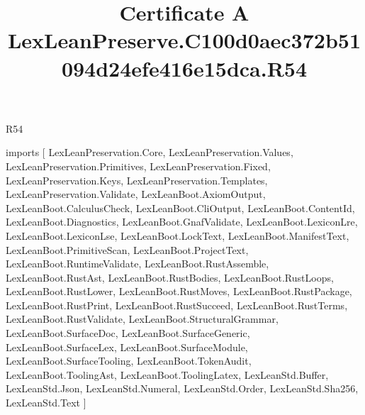 \begin{lexlean}{R54}
\title{Certificate A LexLeanPreserve.C100d0aec372b51094d24efe416e15dca.R54}
\begin{coremodule}
imports [
  LexLeanPreservation.Core,
  LexLeanPreservation.Values,
  LexLeanPreservation.Primitives,
  LexLeanPreservation.Fixed,
  LexLeanPreservation.Keys,
  LexLeanPreservation.Templates,
  LexLeanPreservation.Validate,
  LexLeanBoot.AxiomOutput,
  LexLeanBoot.CalculusCheck,
  LexLeanBoot.CliOutput,
  LexLeanBoot.ContentId,
  LexLeanBoot.Diagnostics,
  LexLeanBoot.GnafValidate,
  LexLeanBoot.LexiconLre,
  LexLeanBoot.LexiconLse,
  LexLeanBoot.LockText,
  LexLeanBoot.ManifestText,
  LexLeanBoot.PrimitiveScan,
  LexLeanBoot.ProjectText,
  LexLeanBoot.RuntimeValidate,
  LexLeanBoot.RustAssemble,
  LexLeanBoot.RustAst,
  LexLeanBoot.RustBodies,
  LexLeanBoot.RustLoops,
  LexLeanBoot.RustLower,
  LexLeanBoot.RustMoves,
  LexLeanBoot.RustPackage,
  LexLeanBoot.RustPrint,
  LexLeanBoot.RustSucceed,
  LexLeanBoot.RustTerms,
  LexLeanBoot.RustValidate,
  LexLeanBoot.StructuralGrammar,
  LexLeanBoot.SurfaceDoc,
  LexLeanBoot.SurfaceGeneric,
  LexLeanBoot.SurfaceLex,
  LexLeanBoot.SurfaceModule,
  LexLeanBoot.SurfaceTooling,
  LexLeanBoot.TokenAudit,
  LexLeanBoot.ToolingAst,
  LexLeanBoot.ToolingLatex,
  LexLeanStd.Buffer,
  LexLeanStd.Json,
  LexLeanStd.Numeral,
  LexLeanStd.Order,
  LexLeanStd.Sha256,
  LexLeanStd.Text
]


\end{coremodule}
\end{lexlean}
